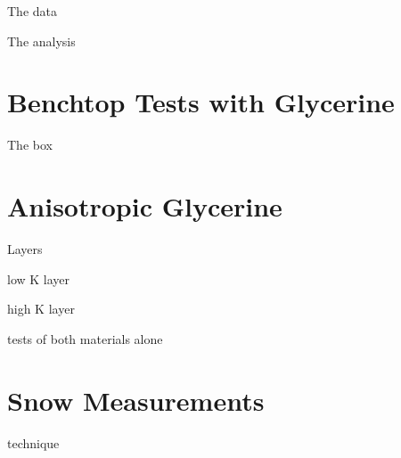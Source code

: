 The data

The analysis

\section{Benchtop Tests with Glycerine}

The box

\section{Anisotropic Glycerine}

Layers

low K layer

high K layer

tests of both materials alone

\section{Snow Measurements}

technique
